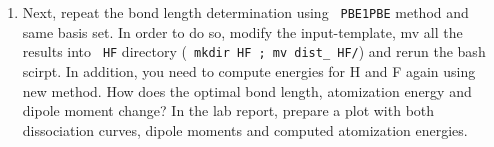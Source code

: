 \begin{enumerate}
\item Next, repeat the bond length determination using \texttt{ PBE1PBE} method and same basis set. In order to do so, modify the input-template, mv all the results into \texttt{ HF} directory (\texttt{ mkdir HF ; mv dist\_\* HF/}) and rerun the bash scirpt. In addition, you need to compute energies for H and F again using new method. How does the optimal bond length, atomization energy and dipole moment change? In the lab report, prepare a plot with both dissociation curves, dipole moments and computed atomization energies. 

\end{enumerate}

%
%
%
